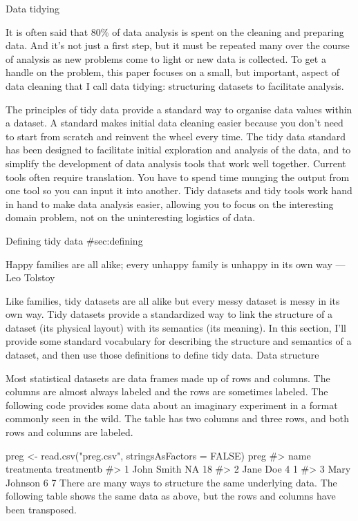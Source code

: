 Data tidying

It is often said that 80\% of data analysis is spent on the cleaning and preparing data. And it's not just a first step, but it must be repeated many over the course of analysis as new problems come to light or new data is collected. To get a handle on the problem, this paper focuses on a small, but important, aspect of data cleaning that I call data tidying: structuring datasets to facilitate analysis.

The principles of tidy data provide a standard way to organise data values within a dataset. A standard makes initial data cleaning easier because you don't need to start from scratch and reinvent the wheel every time. The tidy data standard has been designed to facilitate initial exploration and analysis of the data, and to simplify the development of data analysis tools that work well together. Current tools often require translation. You have to spend time munging the output from one tool so you can input it into another. Tidy datasets and tidy tools work hand in hand to make data analysis easier, allowing you to focus on the interesting domain problem, not on the uninteresting logistics of data.

Defining tidy data {#sec:defining}

Happy families are all alike; every unhappy family is unhappy in its own way — Leo Tolstoy

Like families, tidy datasets are all alike but every messy dataset is messy in its own way. Tidy datasets provide a standardized way to link the structure of a dataset (its physical layout) with its semantics (its meaning). In this section, I'll provide some standard vocabulary for describing the structure and semantics of a dataset, and then use those definitions to define tidy data.
Data structure

Most statistical datasets are data frames made up of rows and columns. The columns are almost always labeled and the rows are sometimes labeled. The following code provides some data about an imaginary experiment in a format commonly seen in the wild. The table has two columns and three rows, and both rows and columns are labeled.

preg <- read.csv("preg.csv", stringsAsFactors = FALSE)
preg
#>           name treatmenta treatmentb
#> 1   John Smith         NA         18
#> 2     Jane Doe          4          1
#> 3 Mary Johnson          6          7
There are many ways to structure the same underlying data. The following table shows the same data as above, but the rows and columns have been transposed.

